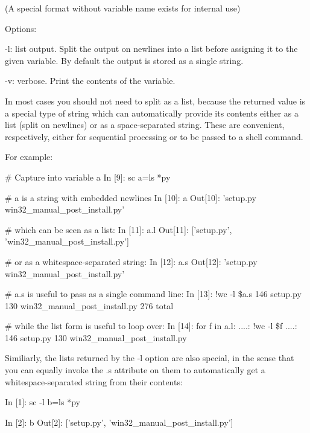         (A special format without variable name exists for internal use)

        Options:

          -l: list output.  Split the output on newlines into a list before
          assigning it to the given variable.  By default the output is stored
          as a single string.

          -v: verbose.  Print the contents of the variable.

        In most cases you should not need to split as a list, because the
        returned value is a special type of string which can automatically
        provide its contents either as a list (split on newlines) or as a
        space-separated string.  These are convenient, respectively, either
        for sequential processing or to be passed to a shell command.

        For example:

            \# Capture into variable a
            In [9]: sc a=ls *py

            \# a is a string with embedded newlines
            In [10]: a
            Out[10]: 'setup.py
win32\_manual\_post\_install.py'

            \# which can be seen as a list:
            In [11]: a.l
            Out[11]: ['setup.py', 'win32\_manual\_post\_install.py']

            \# or as a whitespace-separated string:
            In [12]: a.s
            Out[12]: 'setup.py win32\_manual\_post\_install.py'

            \# a.s is useful to pass as a single command line:
            In [13]: !wc -l \$a.s
              146 setup.py
              130 win32\_manual\_post\_install.py
              276 total

            \# while the list form is useful to loop over:
            In [14]: for f in a.l:
               ....:      !wc -l \$f
               ....:
            146 setup.py
            130 win32\_manual\_post\_install.py

        Similiarly, the lists returned by the -l option are also special, in
        the sense that you can equally invoke the .s attribute on them to
        automatically get a whitespace-separated string from their contents:

            In [1]: sc -l b=ls *py

            In [2]: b
            Out[2]: ['setup.py', 'win32\_manual\_post\_install.py']

